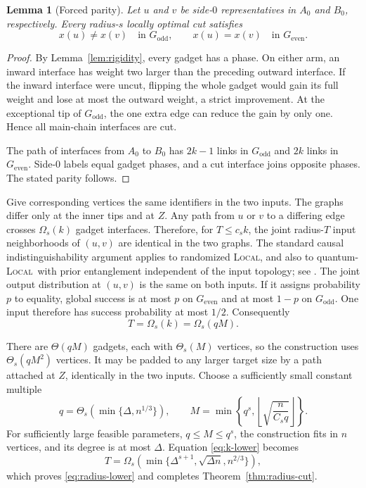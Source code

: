 \documentclass[11pt]{article}
\newtheorem{lemma}[theorem]{Lemma}
\theoremstyle{definition}
\theoremstyle{remark}
\newcommand{\LOCAL}{\textnormal{\textsc{Local}}}
\begin{document}
\begin{lemma}[Forced parity]\label{lem:parity}
Let $u$ and $v$ be side-$0$ representatives in $A_0$ and $B_0$, respectively.
Every radius-$s$ locally optimal cut satisfies
\[
 x(u)\ne x(v)\quad\text{in }G_{\mathrm{odd}},
 \qquad
 x(u)=x(v)\quad\text{in }G_{\mathrm{even}}.
\]
\end{lemma}

\begin{proof}
By Lemma~\ref{lem:rigidity}, every gadget has a phase.  On either arm, an inward
interface has weight two larger than the preceding outward interface.  If the
inward interface were uncut, flipping the whole gadget would gain its full weight
and lose at most the outward weight, a strict improvement.  At the exceptional tip
of $G_{\mathrm{odd}}$, the one extra edge can reduce the gain by only one.  Hence
all main-chain interfaces are cut.

The path of interfaces from $A_0$ to $B_0$ has $2k-1$ links in
$G_{\mathrm{odd}}$ and $2k$ links in $G_{\mathrm{even}}$.  Side-$0$ labels equal
gadget phases, and a cut interface joins opposite phases.  The stated parity follows.
\end{proof}

Give corresponding vertices the same identifiers in the two inputs.  The graphs
differ only at the inner tips and at $Z$.  Any path from $u$ or $v$ to a differing
edge crosses $\Omega_s(k)$ gadget interfaces.  Therefore, for
$T\leq c_s k$, the joint radius-$T$ input neighborhoods of $(u,v)$ are identical in
the two graphs.  The standard causal indistinguishability argument applies to
randomized \LOCAL, and also to quantum-\LOCAL\ with prior entanglement
independent of the input topology; see
\cite{GavoilleKosowskiMarkiewicz2009,AkbariEtAl2025,BalliuEtAl2026}.  The joint
output distribution at $(u,v)$ is the same on both inputs.  If it assigns probability
$p$ to equality, global success is at most $p$ on $G_{\mathrm{even}}$ and at most
$1-p$ on $G_{\mathrm{odd}}$.  One input therefore has success probability at most
$1/2$.  Consequently
\begin{equation}\label{eq:k-lower}
 T=\Omega_s(k)=\Omega_s(qM).
\end{equation}

There are $\Theta(qM)$ gadgets, each with $\Theta_s(M)$ vertices, so the construction
uses $\Theta_s(qM^2)$ vertices.  It may be padded to any larger target size by a path
attached at $Z$, identically in the two inputs.  Choose a sufficiently small constant
multiple
\[
 q=\Theta_s(\min\{\Delta,n^{1/3}\}),
 \qquad
 M=\min\left\{q^s,\left\lfloor\sqrt{\frac{n}{C_s q}}\right\rfloor\right\}.
\]
For sufficiently large feasible parameters, $q\leq M\leq q^s$, the construction
fits in $n$ vertices, and its degree is at most $\Delta$.  Equation
\eqref{eq:k-lower} becomes
\[
 T=\Omega_s\!\left(
 \min\{\Delta^{s+1},\sqrt{\Delta n},n^{2/3}\}
 \right),
\]
which proves \eqref{eq:radius-lower} and completes
Theorem~\ref{thm:radius-cut}.
\end{document}

